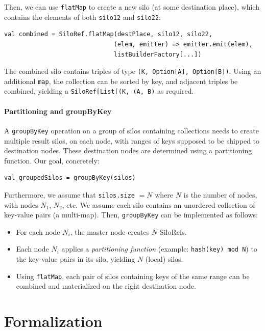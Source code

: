 \documentclass[preprint]{sigplanconf}
\theoremstyle{definition}
\theoremstyle{definition}
\begin{document}
Then, we can use \verb|flatMap| to create a new silo (at some destination
place), which contains the elements of both \verb|silo12| and \verb|silo22|:

\begin{lstlisting}
val combined = SiloRef.flatMap(destPlace, silo12, silo22,
                              (elem, emitter) => emitter.emit(elem),
                              listBuilderFactory[...])
\end{lstlisting}

The combined silo contains triples of type \verb|(K, Option[A], Option[B])|.
Using an additional \verb|map|, the collection can be sorted by key, and adjacent
triples be combined, yielding a \texttt{SiloRef[List[(K, (A, B)} as required.


\paragraph{Partitioning and groupByKey}

A \verb|groupByKey| operation on a group of silos containing collections needs
to create multiple result silos, on each node, with ranges of keys supposed to
be shipped to destination nodes. These destination nodes are determined using
a partitioning function. Our goal, concretely:

\begin{lstlisting}
val groupedSilos = groupByKey(silos)
\end{lstlisting}

Furthermore, we assume that \verb|silos.size| $= N$ where $N$ is the number of
nodes, with nodes $N_1$, $N_2$, etc. We assume each silo contains an unordered
collection of key-value pairs (a multi-map). Then, \verb|groupByKey| can be
implemented as follows:

\begin{itemize}
\item For each node $N_i$, the master node creates $N$ SiloRefs.

\item Each node $N_i$ applies a {\em partitioning function}
(example: \texttt{hash(key) mod N}) to the key-value pairs in its silo,
yielding $N$ (local) silos.

\item Using \verb|flatMap|, each pair of silos containing keys of the
same range can be combined and materialized on the right destination node.
\end{itemize}


\section{Formalization}
\label{sec:formalization}
\end{document}
